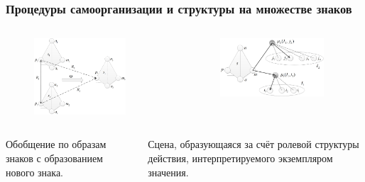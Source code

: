 \documentclass[default]{beamer}
\begin{document}
	\begin{frame}
		\frametitle{Процедуры самоорганизации и структуры на множестве знаков}
		\begin{columns}
			\begin{column}{0.5\textwidth}
				\begin{figure}
					\includegraphics[width=0.8\textwidth]{../pattern_gen.jpg}
				\end{figure}
			\end{column}
			\begin{column}{0.5\textwidth}
				\begin{figure}
					\includegraphics[width=0.9\textwidth]{../mean_scene.jpg}
				\end{figure}
			\end{column}
		\end{columns}
		\begin{columns}
			\begin{column}{0.5\textwidth}
				\begin{center}
					Обобщение по образам знаков с образованием нового знака.
				\end{center}
			\end{column}
			\begin{column}{0.5\textwidth}
				\begin{center}
					Сцена, образующаяся за счёт ролевой структуры действия, интерпретируемого экземпляром значения.
				\end{center}
			\end{column}
		\end{columns}
	\end{frame}
	
\end{document}
